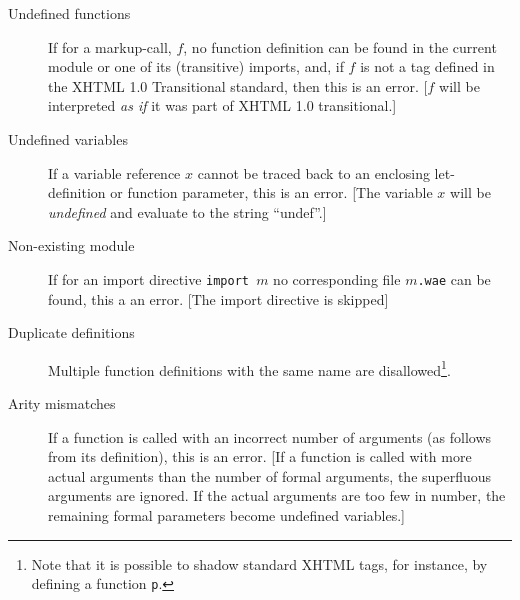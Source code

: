 \documentclass[a4paper]{article}
\begin{document}
\begin{description}
\item[Undefined functions] If for a markup-call, $f$, no function
  definition can be found in the current module or one of its
  (transitive) imports, and, if $f$ is not a tag defined in the XHTML
  1.0 Transitional standard, then this is an error. [$f$ will be
  interpreted \textit{as if} it was part of XHTML 1.0 transitional.]

\item[Undefined variables] If a variable reference $x$ cannot be
  traced back to an enclosing let-definition or function parameter,
  this is an error.  [The variable $x$ will be \textit{undefined} and
  evaluate to the string ``undef''.]

\item[Non-existing module] If for an import directive \texttt{import
    $m$} no corresponding file \texttt{$m$.wae} can be found, this a
  an error. [The import directive is skipped]

\item[Duplicate definitions] Multiple function definitions with the
  same name are disallowed\footnote{Note that it is possible to shadow
    standard XHTML tags, for instance, by defining a function \texttt{p}.}.

\item[Arity mismatches] If a function is called with an incorrect
  number of arguments (as follows from its definition), this is an
  error. [If a function is called with more actual arguments than the
  number of formal arguments, the superfluous arguments are
  ignored. If the actual arguments are too few in number, the
  remaining formal parameters become undefined variables.]
\end{description}
\end{document}
